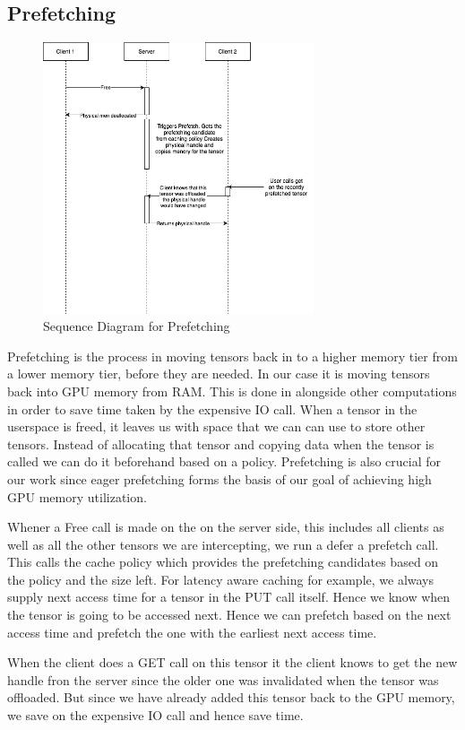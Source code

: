 \documentclass{article}
\begin{document}
\subsection{Prefetching}
\begin{figure}[!htbp]
	\centering
	\includegraphics[height=8cm, width=8cm]{figures/Prefetch.png}
	\caption{Sequence Diagram for Prefetching}
\end{figure}
\FloatBarrier

Prefetching is the process in moving tensors back in to a higher memory tier from a lower memory tier, before they are needed. In our case it is moving tensors back into GPU memory from RAM.
This is done in alongside other computations in order to save time taken by the expensive IO call. When a tensor in the userspace is freed, it leaves us with space
that we can can use to store other tensors. Instead of allocating that tensor and copying data when the tensor is called we can do it beforehand based on a policy. Prefetching is also
crucial for our work since eager prefetching forms the basis of our goal of achieving high GPU memory utilization.

Whener a Free call is made on the on the server side, this includes all clients as well as all the other tensors we are intercepting, we run a defer a prefetch call. This calls the cache policy
which provides the prefetching candidates based on the policy and the size left. For latency aware caching for example, we always supply next access time for a tensor
in the PUT call itself. Hence we know when the tensor is going to be accessed next. Hence we can prefetch based on the next access time and prefetch the one with the earliest next access time.

When the client does a GET call on this tensor it the client knows to get the new handle fron the server since the older one was invalidated when the tensor was offloaded. But since we have already
added this tensor back to the GPU memory, we save on the expensive IO call and hence save time.
\end{document}
